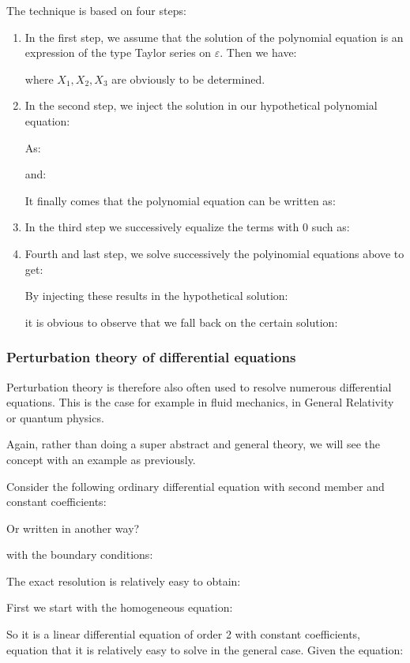 	The technique is based on four steps:
	\begin{enumerate}
		\item In the first step, we assume that the solution of the polynomial equation is an expression of the type Taylor series on $\varepsilon$. Then we have:
		
		where $X_1,X_2,X_3$ are obviously to be determined.
		\item In the second step, we inject the solution in our hypothetical polynomial equation:
		
		As:
		
		and:
		
		It finally comes that the polynomial equation can be written as:
		
		
		\item In the third step we successively equalize the terms with 0 such as:
		
		\item Fourth and last step, we solve successively the polyinomial equations above to get:
		
		By injecting these results in the hypothetical solution:
		
		it is obvious to observe that we fall back on the certain solution:
		
	\end{enumerate}
	
	\pagebreak
	\subsubsection{Perturbation theory of differential equations}
	Perturbation theory is therefore also often used to resolve numerous differential equations. This is the case for example in fluid mechanics, in General Relativity or quantum physics.
	
	Again, rather than doing a super abstract and general theory, we will see the concept with an example as previously.
	
	Consider the following ordinary differential equation with second member and constant coefficients:
	
	Or written in another way?
	
	with the boundary conditions:
	
	The exact resolution is relatively easy to obtain:
	
	First we start with the homogeneous equation:
	
	So it is a linear differential equation of order 2 with constant coefficients, equation that it is relatively easy to solve in the general case. Given the equation:
	
